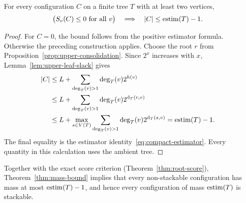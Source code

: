 \begin{theorem}\label{thm:mass-bound}
For every configuration $C$ on a finite tree $T$ with at least two vertices,
\[
 \bigl(S_v(C)\leq0\text{ for all }v\bigr)
 \quad\Longrightarrow\quad
 \lvert C\rvert\leq\operatorname{estim}(T)-1.
\]
\end{theorem}

\begin{proof}
For $C=0$, the bound follows from the positive estimator formula.  Otherwise
the preceding construction applies.  Choose the root $r$ from
Proposition~\ref{prop:upper-consolidation}.  Since $2^x$ increases with
$x$, Lemma~\ref{lem:upper-leaf-slack} gives
\begin{align*}
 \lvert C\rvert
 &\leq L+\sum_{\deg_T(v)>1}\deg_T(v)2^{h(v)}\\
 &\leq L+\sum_{\deg_T(v)>1}\deg_T(v)2^{\operatorname{d}_T(r,v)}\\
 &\leq L+\max_{s\in V(T)}
              \sum_{\deg_T(v)>1}\deg_T(v)2^{\operatorname{d}_T(s,v)}
   =\operatorname{estim}(T)-1.
\end{align*}
The final equality is the estimator identity~\eqref{eq:compact-estimator}.
Every quantity in this calculation uses the ambient tree.
\end{proof}

Together with the exact score criterion (Theorem~\ref{thm:root-score}), Theorem~\ref{thm:mass-bound}
implies that every non-stackable configuration has mass at most
$\operatorname{estim}(T)-1$, and hence every configuration of mass $\operatorname{estim}(T)$ is
stackable.
